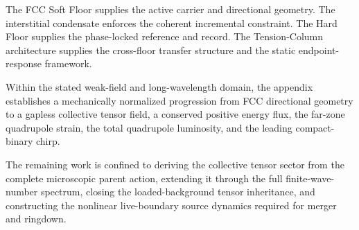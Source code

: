 The FCC Soft Floor supplies the active carrier and directional geometry. The interstitial condensate enforces the coherent incremental constraint. The Hard Floor supplies the phase-locked reference and record. The Tension-Column architecture supplies the cross-floor transfer structure and the static endpoint-response framework.

Within the stated weak-field and long-wavelength domain, the appendix establishes a mechanically normalized progression from FCC directional geometry to a gapless collective tensor field, a conserved positive energy flux, the far-zone quadrupole strain, the total quadrupole luminosity, and the leading compact-binary chirp.

The remaining work is confined to deriving the collective tensor sector from the complete microscopic parent action, extending it through the full finite-wave-number spectrum, closing the loaded-background tensor inheritance, and constructing the nonlinear live-boundary source dynamics required for merger and ringdown.
